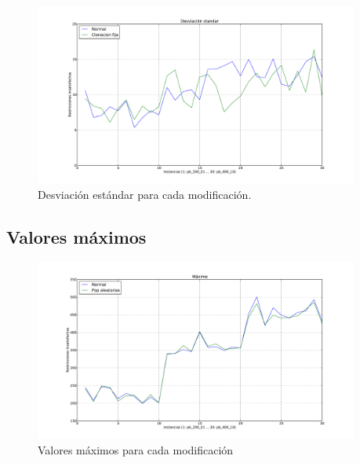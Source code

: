 \begin{figure}[h!]
\begin{center}
\includegraphics[width=0.95\textwidth]{img/s-4.pdf}
\end{center}
\caption{Desviación estándar para cada modificación.}
\label{fig:s-4}
\end{figure}

\newpage

\subsection{Valores máximos}

\begin{figure}[h!]
\begin{center}
\includegraphics[width=0.95\textwidth]{img/max-1.pdf}
\end{center}
\caption{Valores máximos para cada modificación}
\label{fig:max-1}
\end{figure}

